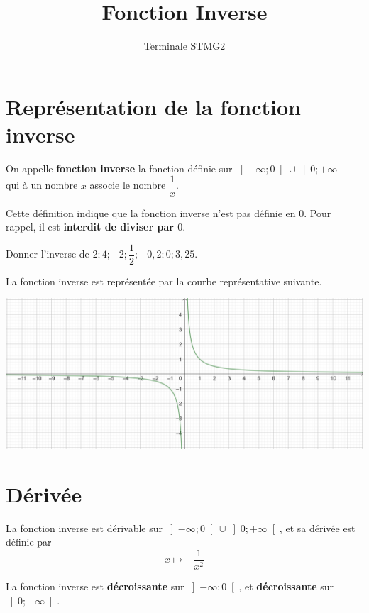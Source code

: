 \documentclass{article}
\title{Fonction Inverse}
\author{Terminale STMG2}
\date{}
\begin{document}
\maketitle

\section{Représentation de la fonction inverse}
\begin{tcolorbox}
\begin{definition}
On appelle \textbf{fonction inverse} la fonction définie sur $\left]-\infty;0\right[ \cup \left]0;+\infty \right[$ qui à un nombre $x$ associe le nombre $\dfrac{1}{x}$.
\end{definition}
\end{tcolorbox}
\begin{remark}
Cette définition indique que la fonction inverse n'est pas définie en $0$. Pour rappel, il est \textbf{interdit de diviser par $0$}.
\end{remark}
\begin{example}
Donner l'inverse de $2; 4; -2; \dfrac{1}{2}; -0,2; 0; 3,25$.
\end{example}
\begin{proposition}
La fonction inverse est représentée par la courbe représentative suivante.
\begin{center}
\includegraphics[width=\textwidth]{Courbe.png}
\end{center}
\end{proposition}
\section{Dérivée}
\begin{proposition}
La fonction inverse est dérivable sur $\left]-\infty;0\right[ \cup \left]0;+\infty \right[$, et sa dérivée est définie par
\begin{equation*}
x \mapsto - \dfrac{1}{x^2}
\end{equation*}
\end{proposition}
\begin{proposition}
La fonction inverse est \textbf{décroissante} sur $\left]-\infty;0\right[$, et \textbf{décroissante} sur $\left]0;+\infty \right[$.
\end{proposition}
\begin{center}
\end{center}
\end{document}
